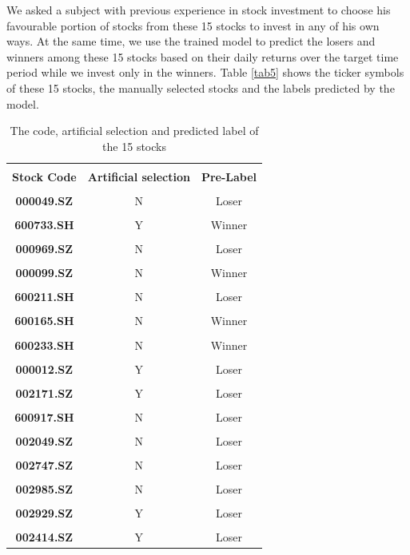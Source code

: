 \documentclass[default,iicol]{sn-jnl}%
\begin{document}
We asked a subject with previous experience in stock investment to choose his favourable portion of stocks from these 15 stocks to invest in any of his own ways. At the same time, we use the trained model to predict the losers and winners among these 15 stocks based on their daily returns over the target time period while we invest only in the winners. Table \eqref{tab5} shows the ticker symbols of these 15 stocks, the manually selected stocks and the labels predicted by the model.
\begin{table}[htbp]
	\centering  
	\begin{tabular}{|c|c|c|}  
		\hline  %
		& & \\[-6pt]  %
		\textbf{Stock Code}&\textbf{Artificial selection}&\textbf{Pre-Label} \\  
		\hline
		& & \\[-6pt]
		\textbf{000049.SZ}&N&Loser \\
		\hline
		& & \\[-6pt]
		\textbf{600733.SH}&Y&Winner \\
		\hline
		& & \\[-6pt]
		\textbf{000969.SZ}&N&Loser \\
		\hline
		& & \\[-6pt]
		\textbf{000099.SZ}&N&Winner \\
		\hline
		& & \\[-6pt]
		\textbf{600211.SH}&N&Loser \\
		\hline
		& & \\[-6pt]
		\textbf{600165.SH}&N&Winner \\
		\hline
		& & \\[-6pt]
		\textbf{600233.SH}&N&Winner \\
		\hline
		& & \\[-6pt]
		\textbf{000012.SZ}&Y&Loser \\
		\hline
		& & \\[-6pt]
		\textbf{002171.SZ}&Y&Loser \\
		\hline
		& & \\[-6pt]
		\textbf{600917.SH}&N&Loser\\
		\hline
		& & \\[-6pt]
		\textbf{002049.SZ}&N&Loser \\
		\hline
		& & \\[-6pt]
		\textbf{002747.SZ}&N&Loser \\
		\hline
		& & \\[-6pt]
		\textbf{002985.SZ}&N&Loser \\
		\hline
		& & \\[-6pt]
		\textbf{002929.SZ}&Y&Loser \\
		\hline
		& & \\[-6pt]
		\textbf{002414.SZ}&Y&Loser \\
		\hline
	\end{tabular}
	\caption{The code, artificial selection and predicted label of the 15 stocks} 
	\label{tab5}
\end{table}
\end{document}
